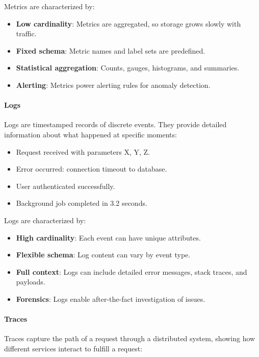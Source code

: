 Metrics are characterized by:
\begin{itemize}
    \item \textbf{Low cardinality}: Metrics are aggregated, so storage grows slowly with traffic.
    \item \textbf{Fixed schema}: Metric names and label sets are predefined.
    \item \textbf{Statistical aggregation}: Counts, gauges, histograms, and summaries.
    \item \textbf{Alerting}: Metrics power alerting rules for anomaly detection.
\end{itemize}

\paragraph{Logs}

Logs are timestamped records of discrete events. They provide detailed information about what happened at specific moments:

\begin{itemize}
    \item Request received with parameters X, Y, Z.
    \item Error occurred: connection timeout to database.
    \item User authenticated successfully.
    \item Background job completed in 3.2 seconds.
\end{itemize}

Logs are characterized by:
\begin{itemize}
    \item \textbf{High cardinality}: Each event can have unique attributes.
    \item \textbf{Flexible schema}: Log content can vary by event type.
    \item \textbf{Full context}: Logs can include detailed error messages, stack traces, and payloads.
    \item \textbf{Forensics}: Logs enable after-the-fact investigation of issues.
\end{itemize}

\paragraph{Traces}

Traces capture the path of a request through a distributed system, showing how different services interact to fulfill a request:

